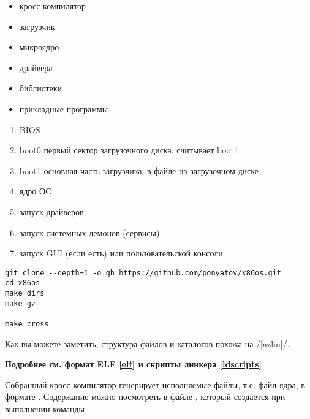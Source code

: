 
\begin{itemize}
  \item кросс-компилятор
  \item загрузчик
  \item микроядро
  \item драйвера
  \item библиотеки
  \item прикладные программы
\end{itemize}


\begin{enumerate}
  \item BIOS
  \item boot0 первый сектор загрузочного диска, считывает boot1
  \item boot1 основная часть загрузчика, в файле на загрузочном диске
  \item ядро ОС
  \item запуск драйверов
  \item запуск системных демонов (сервисы)
  \item запуск GUI (если есть) или пользовательской консоли
\end{enumerate}


\begin{verbatim}
git clone --depth=1 -o gh https://github.com/ponyatov/x86os.git
cd x86os 
make dirs
make gz

make cross
\end{verbatim}


Как вы можете заметить, структура файлов и каталогов похожа на
 /\ref{azlin}/.


\textbf{Подробнее см. формат ELF \ref{elf} и скрипты линкера \ref{ldscripts}}
\bigskip

Собранный кросс-компилятор генерирует исполняемые файлы, т.е. файл ядра, в
формате . Содержание можно посмотреть в файле
, который создается при выполнении команды 

